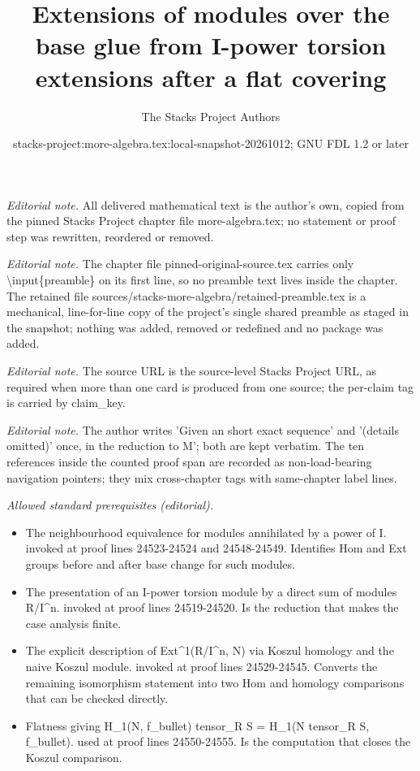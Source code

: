 \documentclass[10pt,a4paper]{amsart}
\title{Extensions of modules over the base glue from I-power torsion extensions after a flat covering}
\author{The Stacks Project Authors}
\date{stacks-project:more-algebra.tex:local-snapshot-20261012; GNU FDL 1.2 or later}
\theoremstyle{plain}
\theoremstyle{definition}
\theoremstyle{remark}
\numberwithin{equation}{subsection}
\begin{document}
\maketitle
\setcounter{subsection}{1}
\noindent\textit{Editorial note.} All delivered mathematical text is the author's own, copied from the pinned Stacks Project chapter file more-algebra.tex; no statement or proof step was rewritten, reordered or removed.\par\medskip
\noindent\textit{Editorial note.} The chapter file pinned-original-source.tex carries only \textbackslash{}input\{preamble\} on its first line, so no preamble text lives inside the chapter. The retained file sources/stacks-more-algebra/retained-preamble.tex is a mechanical, line-for-line copy of the project's single shared preamble as staged in the snapshot; nothing was added, removed or redefined and no package was added.\par\medskip
\noindent\textit{Editorial note.} The source URL is the source-level Stacks Project URL, as required when more than one card is produced from one source; the per-claim tag is carried by claim\_key.\par\medskip
\noindent\textit{Editorial note.} The author writes 'Given an short exact sequence' and '(details omitted)' once, in the reduction to M'; both are kept verbatim. The ten references inside the counted proof span are recorded as non-load-bearing navigation pointers; they mix cross-chapter tags with same-chapter label lines.\par\medskip
\noindent\textit{Allowed standard prerequisites (editorial).}\begin{itemize}
\item The neighbourhood equivalence for modules annihilated by a power of I. invoked at proof lines 24523-24524 and 24548-24549. Identifies Hom and Ext groups before and after base change for such modules.
\item The presentation of an I-power torsion module by a direct sum of modules R/I\textasciicircum{}n. invoked at proof lines 24519-24520. Is the reduction that makes the case analysis finite.
\item The explicit description of Ext\textasciicircum{}1(R/I\textasciicircum{}n, N) via Koszul homology and the naive Koszul module. invoked at proof lines 24529-24545. Converts the remaining isomorphism statement into two Hom and homology comparisons that can be checked directly.
\item Flatness giving H\_1(N, f\_bullet) tensor\_R S = H\_1(N tensor\_R S, f\_bullet). used at proof lines 24550-24555. Is the computation that closes the Koszul comparison.
\end{itemize}\medskip
\end{document}
